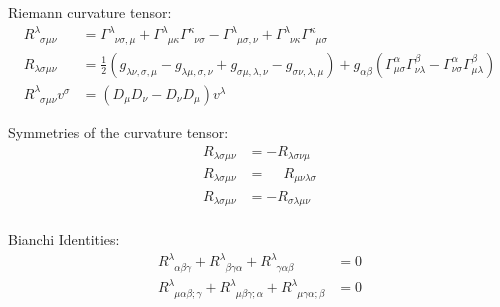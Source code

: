 			\noindent
			Riemann curvature tensor:
			\begin{equation}
				\begin{aligned}
					R^{\lambda}_{\phantom{\lambda}\sigma\mu\nu} &= \Gamma^{\lambda}_{\phantom{\lambda}\nu\sigma,\mu}
					+ \Gamma^{\lambda}_{\phantom{\lambda}\mu\kappa}\Gamma^{\kappa}_{\phantom{\kappa}\nu\sigma}
					-
					\Gamma^{\lambda}_{\phantom{\lambda}\mu\sigma,\nu}
					+ \Gamma^{\lambda}_{\phantom{\lambda}\nu\kappa}\Gamma^{\kappa}_{\phantom{\kappa}\mu\sigma} \\
					R_{\lambda\sigma\mu\nu} &= \frac{1}{2}\left(
					g_{\lambda\nu,\sigma,\mu} - g_{\lambda\mu,\sigma,\nu} + g_{\sigma\mu,\lambda,\nu} -	 g_{\sigma\nu,\lambda,\mu}
					\right)
					+ g_{\alpha\beta} \left(
					\Gamma^{\alpha}_{\mu\sigma} \Gamma^{\beta}_{\nu\lambda} - \Gamma^{\alpha}_{\nu\sigma} \Gamma^{\beta}_{\mu\lambda}
					\right)
					\\
					R^{\lambda}_{\phantom{\lambda}\sigma\mu\nu}v^\sigma &= \left(D_\mu D_\nu - D_\nu D_\mu \right) v^\lambda
				\end{aligned}
			\end{equation}

			\noindent
			Symmetries of the curvature tensor:%
			\begin{equation}
				\begin{aligned}
					R_{\lambda\sigma\mu\nu} &= - R_{\lambda\sigma\nu\mu} \\
					R_{\lambda\sigma\mu\nu} &= \phantom{-} R_{\mu\nu\lambda\sigma} \\
					R_{\lambda\sigma\mu\nu} &= - R_{\sigma\lambda\mu\nu} \\
				\end{aligned}
			\end{equation}

			\noindent
			Bianchi Identities:
			\begin{equation}
				\begin{aligned}
					R^{\lambda}_{\phantom{\lambda}\alpha\beta\gamma} + R^{\lambda}_{\phantom{\lambda}\beta\gamma\alpha} + R^{\lambda}_{\phantom{\lambda}\gamma\alpha\beta} &= 0 \\
					R^{\lambda}_{\phantom{\lambda}\mu\alpha\beta;\gamma} + R^{\lambda}_{\phantom{\lambda}\mu\beta\gamma;\alpha} + R^{\lambda}_{\phantom{\lambda}\mu\gamma\alpha;\beta} &= 0 \\
				\end{aligned}
			\end{equation}

